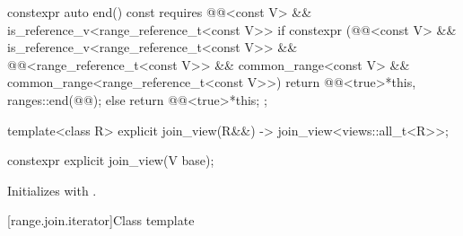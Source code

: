 \begin{codeblock}
{{    constexpr auto end() const
    requires @@<const V> &&
             is_reference_v<range_reference_t<const V>> {
      if constexpr (@@<const V> &&
                    is_reference_v<range_reference_t<const V>> &&
                    @@<range_reference_t<const V>> &&
                    common_range<const V> &&
                    common_range<range_reference_t<const V>>)
        return @@<true>{*this, ranges::end(@@)};
      else
        return @@<true>{*this};
    }
  };

  template<class R>
    explicit join_view(R&&) -> join_view<views::all_t<R>>;
}
\end{codeblock}

%
\begin{itemdecl}
constexpr explicit join_view(V base);
\end{itemdecl}

\begin{itemdescr}
\pnum
\effects
Initializes  with .
\end{itemdescr}

[range.join.iterator]{Class template }

